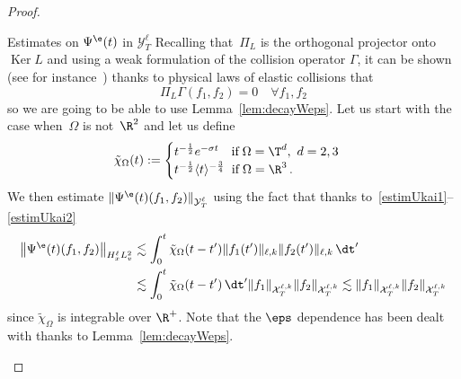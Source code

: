 \begin{proof}
\begin{laststep}{Estimates on $\Psi^\e(t)$ in $\mathcal{Y}^\ell_T$}
Recalling that~$
\Pi_{L} $ is the orthogonal projector onto $\operatorname{Ker} L$ and using a weak formulation of the collision operator $\Gamma$, it can be shown (see for instance~\cite{Ukai-Yang}) thanks to physical laws of elastic collisions that
\[
\Pi_{L} \Gamma(f_1,f_2) = 0 \quad \forall f_1,f_2
\]
so we are going to be able to use Lemma~\ref{lem:decayWeps}. Let us start with the case when~$\Omega$ is not~$\R^2$ and let us define
\begin{equation}\label{def:tildechi}
\tilde \chi_\Omega(t):=
\begin{cases}
t^{-\frac12} e^{-\sigma t}\quad\text{if}\; \Omega = \T^d, \, \, d = 2,3 \\
t^{-\frac12} \langle t \rangle^{-\frac 34} \;\;\text{if}\; \Omega = \R^3 \,.
\end{cases}
\end{equation}
We then estimate $\|\Psi^{\e}(t) (f_1,f_2)\|_{\mathcal{Y}^\ell_T}$ using the fact that thanks to~\eqref{estimUkai1}--\eqref{estimUkai2}
\begin{align*}
\big \| \Psi^{\e}(t) (f_1,f_2)\big\|_{H^\ell_x L^2_v} &\lesssim \int_0^t \tilde \chi_\Omega(t-t') \|f_1(t')\|_{\ell,k} \|f_2(t')\|_{\ell,k} \, \dt'\\
& \lesssim \int_0^t\tilde \chi_\Omega(t-t') \, \dt' \| f _1 \|_{\mathcal{X}^{\ell,k}_T}\| f _2 \|_{\mathcal{X}^{\ell,k}_T}
\lesssim \| f _1 \|_{\mathcal{X}^{\ell,k}_T}\| f _2 \|_{\mathcal{X}^{\ell,k}_T}
\end{align*}
since $\tilde \chi_\Omega$ is integrable over $\R^+$. Note that the $\eps$ dependence has been dealt with thanks to Lemma~\ref{lem:decayWeps}.


\end{laststep}
\end{proof}
